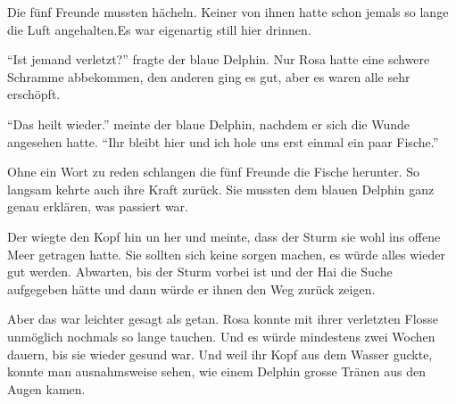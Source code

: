 Die fünf Freunde mussten hächeln. Keiner von ihnen hatte schon jemals so lange die Luft angehalten.Es war eigenartig still hier drinnen.

\enquote{Ist jemand verletzt?} fragte der blaue Delphin. Nur Rosa hatte eine schwere Schramme abbekommen, den anderen ging es gut, aber es waren alle sehr erschöpft.

\enquote{Das heilt wieder.} meinte der blaue Delphin, nachdem er sich die Wunde angesehen hatte. \enquote{Ihr bleibt hier und ich hole uns erst einmal ein paar Fische.}

Ohne ein Wort zu reden schlangen die fünf Freunde die Fische herunter. So langsam kehrte auch ihre Kraft zurück. Sie mussten dem blauen Delphin ganz genau erklären, was passiert war.

Der wiegte den Kopf hin un her und meinte, dass der Sturm sie wohl ins offene Meer getragen hatte. Sie sollten sich keine sorgen machen, es würde alles wieder gut werden. Abwarten, bis der Sturm vorbei ist und der Hai die Suche aufgegeben hätte und dann würde er ihnen den Weg zurück zeigen.

Aber das war leichter gesagt als getan. Rosa konnte mit ihrer verletzten Flosse unmöglich nochmals so lange tauchen. Und es würde mindestens zwei Wochen dauern, bis sie wieder gesund war. Und weil ihr Kopf aus dem Wasser guckte, konnte man ausnahmsweise sehen, wie einem Delphin grosse Tränen aus den Augen kamen.


